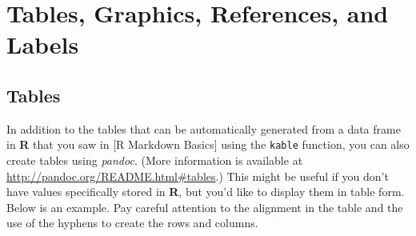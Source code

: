 \documentclass[12pt,twoside]{amherstthesis}
\begin{document}
  \hypertarget{ref_labels}{\chapter{Tables, Graphics, References, and
  Labels}\label{ref_labels}}
  
  \section{Tables}\label{tables}
  
  In addition to the tables that can be automatically generated from a
  data frame in \textbf{R} that you saw in {[}R Markdown Basics{]} using
  the \texttt{kable} function, you can also create tables using
  \emph{pandoc}. (More information is available at
  \url{http://pandoc.org/README.html\#tables}.) This might be useful if
  you don't have values specifically stored in \textbf{R}, but you'd like
  to display them in table form. Below is an example. Pay careful
  attention to the alignment in the table and the use of the hyphens to
  create the rows and columns.
  
\end{document}
